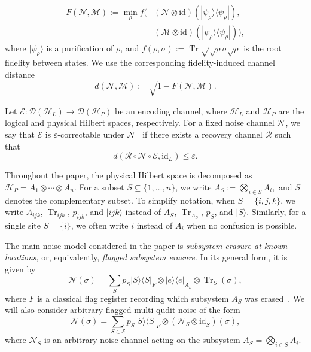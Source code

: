 \documentclass[10pt,twocolumn,superscriptaddress,aps,amsmath,amssymb,citeautoscript,floatfix,prx,longbibliography]{revtex4-2}
\theoremstyle{plain}
\theoremstyle{plain}
\theoremstyle{plain}
\theoremstyle{plain}
\theoremstyle{plain}
\theoremstyle{plain}
\begin{document}
\[
\begin{aligned}
F(\mathcal N,\mathcal M)
:=
\min_{\rho}
f\Big(
    &(\mathcal N\otimes \mathrm{id})(|\psi_\rho\rangle\langle\psi_\rho|),\\
    &(\mathcal M\otimes \mathrm{id})(|\psi_\rho\rangle\langle\psi_\rho|)
\Big),
\end{aligned}
\]
where \(|\psi_\rho\rangle\) is a purification of \(\rho\), and
$
    f(\rho,\sigma)
    :=
    \operatorname{Tr}\sqrt{\sqrt{\rho}\sigma\sqrt{\rho}}
$
is the root fidelity between states. We use the corresponding fidelity-induced channel distance
\begin{equation}\label{eq:distance_def}
    d(\mathcal N,\mathcal M)
    :=
    \sqrt{1-F(\mathcal N,\mathcal M)}.
\end{equation}

Let
$
    \mathcal E:\mathcal D(\mathcal H_L)\to \mathcal D(\mathcal H_P)
$
be an encoding channel, where \(\mathcal H_L\) and \(\mathcal H_P\) are the logical and physical Hilbert spaces, respectively. For a fixed noise channel \(\mathcal N\), we say that \(\mathcal E\) is \(\varepsilon\)-correctable under \(\mathcal N\)~\cite{Beny2010} if there exists a recovery channel \(\mathcal R\) such that
\[
    d(\mathcal R\circ \mathcal N\circ \mathcal E,\mathrm{id}_L)
    \leq \varepsilon .
\]

Throughout the paper, the physical Hilbert space is decomposed as
$
    \mathcal H_P=A_1\otimes\cdots\otimes A_n .
$
For a subset \(S\subseteq \{1,\ldots,n\}\), we write
$
    A_S:=\bigotimes_{i\in S}A_i,
$
and \(\bar S\) denotes the complementary subset. To simplify notation, when \(S=\{i,j,k\}\), we write \(A_{ijk}\), \(\operatorname{Tr}_{ijk}\), \(p_{ijk}\), and \(|ijk\rangle\) instead of \(A_S\), \(\operatorname{Tr}_{A_S}\), \(p_S\), and \(|S\rangle\). Similarly, for a single site \(S=\{i\}\), we often write \(i\) instead of \(A_i\) when no confusion is possible.

The main noise model considered in the paper is \textit{subsystem erasure at known locations}, or, equivalently, \textit{flagged subsystem erasure}. In its general form, it is given by
\begin{equation}\label{eq:erasure_noise}
    \mathcal N(\sigma)
    =
    \sum_{S}p_S
    |S\rangle\langle S|_F
    \otimes
    |e\rangle\langle e|_{A_S}
    \otimes
    \operatorname{Tr}_{S}(\sigma),
\end{equation}
where \(F\) is a classical flag register recording which subsystem \(A_S\) was erased~\cite{Faist2020}. We will also consider arbitrary flagged multi-qudit noise of the form
\begin{equation}\label{eq:arbitrary_multiqudit_noise}
    \mathcal N(\sigma)
    =
    \sum_{S\in\mathcal S}
    p_S
    |S\rangle\langle S|_F
    \otimes
    \left(\mathcal N_S\otimes \mathrm{id}_{\bar S}\right)(\sigma),
\end{equation}
where \(\mathcal N_S\) is an arbitrary noise channel acting on the subsystem \(A_S=\bigotimes_{i\in S}A_i\).
\end{document}

